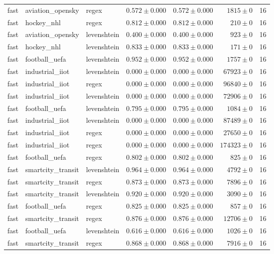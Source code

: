 \begin{table}[htbp]
\begin{tabular}{l l l r r r r}
fast & aviation\_opensky & regex & $0.572\pm0.000$ & $0.572\pm0.000$ & $1815\pm0$ & 16 \\
fast & hockey\_nhl & regex & $0.812\pm0.000$ & $0.812\pm0.000$ & $210\pm0$ & 16 \\
fast & aviation\_opensky & levenshtein & $0.400\pm0.000$ & $0.400\pm0.000$ & $923\pm0$ & 16 \\
fast & hockey\_nhl & levenshtein & $0.833\pm0.000$ & $0.833\pm0.000$ & $171\pm0$ & 16 \\
fast & football\_uefa & levenshtein & $0.952\pm0.000$ & $0.952\pm0.000$ & $1757\pm0$ & 16 \\
fast & industrial\_iiot & levenshtein & $0.000\pm0.000$ & $0.000\pm0.000$ & $67923\pm0$ & 16 \\
fast & industrial\_iiot & regex & $0.000\pm0.000$ & $0.000\pm0.000$ & $96840\pm0$ & 16 \\
fast & industrial\_iiot & levenshtein & $0.000\pm0.000$ & $0.000\pm0.000$ & $72906\pm0$ & 16 \\
fast & football\_uefa & levenshtein & $0.795\pm0.000$ & $0.795\pm0.000$ & $1084\pm0$ & 16 \\
fast & industrial\_iiot & levenshtein & $0.000\pm0.000$ & $0.000\pm0.000$ & $87489\pm0$ & 16 \\
fast & industrial\_iiot & regex & $0.000\pm0.000$ & $0.000\pm0.000$ & $27650\pm0$ & 16 \\
fast & industrial\_iiot & regex & $0.000\pm0.000$ & $0.000\pm0.000$ & $174323\pm0$ & 16 \\
fast & football\_uefa & regex & $0.802\pm0.000$ & $0.802\pm0.000$ & $825\pm0$ & 16 \\
fast & smartcity\_transit & levenshtein & $0.964\pm0.000$ & $0.964\pm0.000$ & $4792\pm0$ & 16 \\
fast & smartcity\_transit & regex & $0.873\pm0.000$ & $0.873\pm0.000$ & $7896\pm0$ & 16 \\
fast & smartcity\_transit & levenshtein & $0.920\pm0.000$ & $0.920\pm0.000$ & $3090\pm0$ & 16 \\
fast & football\_uefa & regex & $0.825\pm0.000$ & $0.825\pm0.000$ & $857\pm0$ & 16 \\
fast & smartcity\_transit & regex & $0.876\pm0.000$ & $0.876\pm0.000$ & $12706\pm0$ & 16 \\
fast & football\_uefa & levenshtein & $0.616\pm0.000$ & $0.616\pm0.000$ & $1026\pm0$ & 16 \\
fast & smartcity\_transit & regex & $0.868\pm0.000$ & $0.868\pm0.000$ & $7916\pm0$ & 16 \\

\end{tabular}
\end{table}
